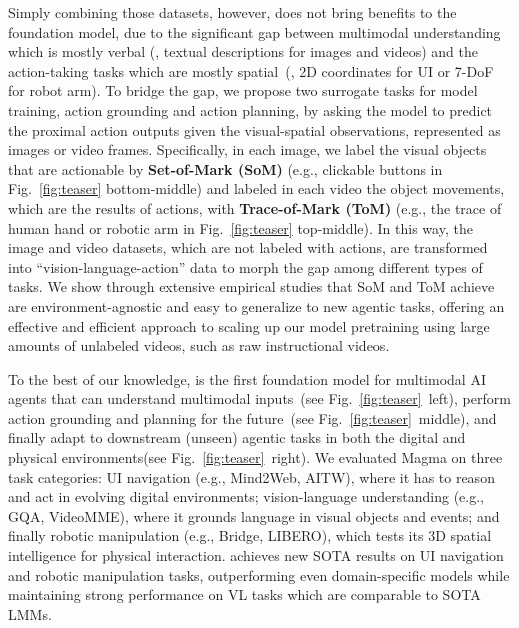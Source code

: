 Simply combining those datasets, however, does not bring benefits to the foundation model, due to the significant gap between multimodal understanding which is mostly verbal (\ie, textual descriptions for images and videos) and the action-taking tasks which are mostly spatial~(\ie, 2D coordinates for UI or 7-DoF for robot arm). To bridge the gap, we propose two surrogate tasks for model training, action grounding and action planning, by asking the model to predict the proximal action outputs given the visual-spatial observations, represented as images or video frames. 
Specifically, in each image, we label the visual objects that are actionable by \textbf{Set-of-Mark (SoM)} (e.g., clickable buttons in Fig.~\ref{fig:teaser} bottom-middle) and labeled in each video the object movements, which are the results of actions, with \textbf{Trace-of-Mark (ToM)} (e.g., the trace of human hand or robotic arm in Fig.~\ref{fig:teaser} top-middle). In this way, the image and video datasets, which are not labeled with actions, are transformed into ``vision-language-action'' data to morph the gap among different types of tasks. 
We show through extensive empirical studies that SoM and ToM achieve are environment-agnostic and easy to generalize to new agentic tasks, offering an effective and efficient approach to scaling up our \magma model pretraining using large amounts of unlabeled videos, such as raw instructional videos.

To the best of our knowledge, \magma is the first foundation model for multimodal AI agents that can understand multimodal inputs~(see Fig.~\ref{fig:teaser}~left), perform action grounding and planning for the future~(see Fig.~\ref{fig:teaser}~middle), and finally adapt to downstream (unseen) agentic tasks in both the digital and physical environments(see Fig.~\ref{fig:teaser}~right). We evaluated Magma on three task categories: UI navigation (e.g., Mind2Web, AITW), where it has to reason and act in evolving digital environments; vision-language understanding (e.g., GQA, VideoMME), where it grounds language in visual objects and events; and finally robotic manipulation (e.g., Bridge, LIBERO), which tests its 3D spatial intelligence for physical interaction. \magma achieves new SOTA results on UI navigation and robotic manipulation tasks, outperforming even domain-specific models while maintaining strong performance on VL tasks which are comparable to SOTA LMMs. 

